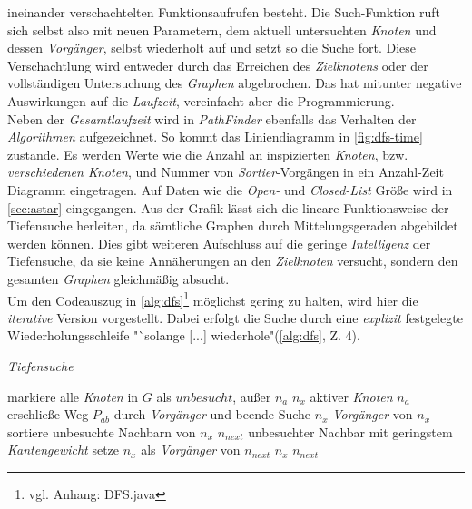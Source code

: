 \documentclass[12pt]{article}
\begin{document}
\noindent ineinander verschachtelten Funktionsaufrufen besteht. Die Such-Funktion ruft sich selbst also mit neuen Parametern, dem aktuell untersuchten \textit{Knoten} und dessen 
\textit{Vorgänger}, selbst wiederholt auf und setzt so die Suche fort. Diese Verschachtlung wird entweder durch das Erreichen des \textit{Zielknotens} oder der vollständigen Untersuchung des \textit{Graphen} abgebrochen. Das hat mitunter negative Auswirkungen auf die \textit{Laufzeit}, vereinfacht aber die Programmierung. 
\\
Neben der \textit{Gesamtlaufzeit} wird in \textit{PathFinder} ebenfalls das Verhalten der \textit{Algorithmen} aufgezeichnet. So kommt das Liniendiagramm in \autoref{fig:dfs-time} zustande. Es werden Werte wie die Anzahl an inspizierten \textit{Knoten}, bzw. \textit{verschiedenen Knoten}, und Nummer von \textit{Sortier}-Vorgängen in ein Anzahl-Zeit Diagramm eingetragen. Auf Daten wie die \textit{Open-} und \textit{Closed-List} Größe wird in \autoref{sec:astar} eingegangen. Aus der Grafik lässt sich die lineare Funktionsweise der Tiefensuche herleiten, da sämtliche Graphen durch Mittelungsgeraden abgebildet werden können. Dies gibt weiteren Aufschluss auf die geringe \textit{Intelligenz} der Tiefensuche, da sie keine Annäherungen an den \textit{Zielknoten} versucht, sondern den gesamten \textit{Graphen} gleichmäßig absucht.
\\
Um den Codeauszug in \autoref{alg:dfs}\footnote{vgl. Anhang: DFS.java} möglichst gering zu halten, wird hier die \textit{iterative} Version vorgestellt. Dabei erfolgt die Suche durch eine \textit{explizit} festgelegte Wiederholungsschleife "`solange [...] wiederhole"(\autoref{alg:dfs}, Z. 4). 
\begin{algorithm}
\caption{\textit{Tiefensuche} \label{alg:dfs}}
\begin{algorithmic}[1]
\Statex
{}
\Statex
{}
	\State markiere alle \textit{Knoten} in $G$ als $unbesucht$, außer $n_a$
	\State \sei $n_x$ aktiver \textit{Knoten} $n_a$
			\State erschließe Weg $P_{ab}$ durch \textit{Vorgänger} und beende Suche
		\EndIf
			\State \sei $n_x$ \textit{Vorgänger} von $n_x$
		\Else
			\State sortiere unbesuchte Nachbarn von $n_x$
			\State \sei $n_{next}$ unbesuchter Nachbar mit geringstem \textit{Kantengewicht}
			\State setze $n_x$ als \textit{Vorgänger} von $n_{next}$
			\State \sei $n_x$ $n_{next}$
		\EndIf
	\EndWhile
\EndProcedure
\end{algorithmic}
\end{algorithm}
\end{document}
